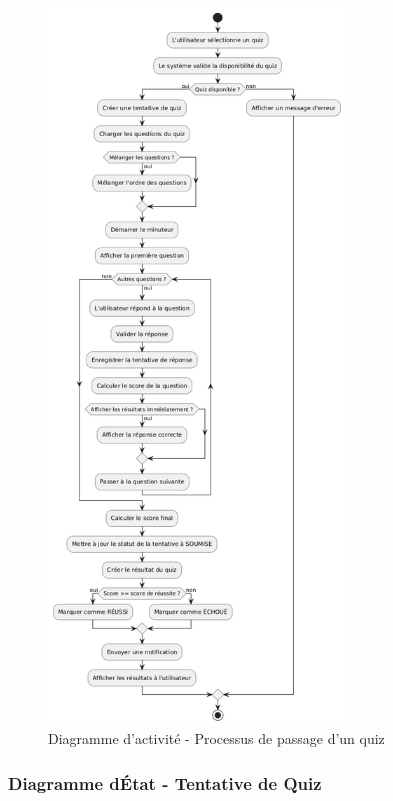 \documentclass[12pt,a4paper,twoside,openright]{report}
\begin{document}
\begin{figure}[H]
\centering
\includegraphics[width=0.7\textwidth]{latex_media/media/image20.png}
\caption{Diagramme d'activité - Processus de passage d'un quiz}
\label{fig:diagramme-activite-quiz}
\end{figure}

\hypertarget{diagramme-duxe9tat---tentative-de-quiz}{%
\subsubsection{Diagramme d\textquotesingle État - Tentative de
Quiz}\label{diagramme-duxe9tat---tentative-de-quiz}}
\end{document}
